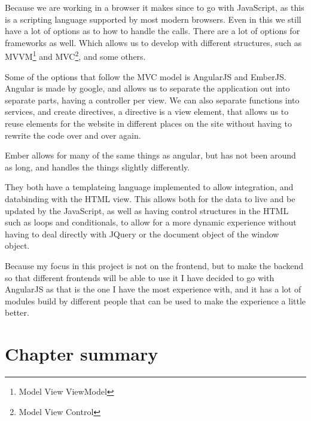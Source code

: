 Because we are working in a browser it makes since to go with JavaScript, as this is a scripting language supported by most modern browsers. Even in this we still have a lot of options as to how to handle the calls. There are a lot of options for frameworks as well. Which allows us to develop with different structures, such as MVVM\footnote{Model View ViewModel} and MVC\footnote{Model View Control}, and some others.

Some of the options that follow the MVC model is AngularJS and EmberJS. Angular is made by google\cite{angularjs}, and allows us to separate the application out into separate parts, having a controller per view. We can also separate functions into services, and create directives, a directive is a view element, that allows us to reuse elements for the website in different places on the site without having to rewrite the code over and over again.

Ember allows for many of the same things as angular, but has not been around as long, and handles the things slightly differently\cite{emberjs}.

They both have a templateing language implemented to allow integration, and databinding with the HTML view. This allows both for the data to live and be updated by the JavaScript, as well as having control structures in the HTML such as loops and conditionals, to allow for a more dynamic experience without having to deal directly with JQuery or the document object of the window object.

Because my focus in this project is not on the frontend, but to make the backend so that different frontends will be able to use it I have decided to go with AngularJS as that is the one I have the most experience with, and it has a lot of modules build by different people that can be used to make the experience a little better.

\section{Chapter summary }
